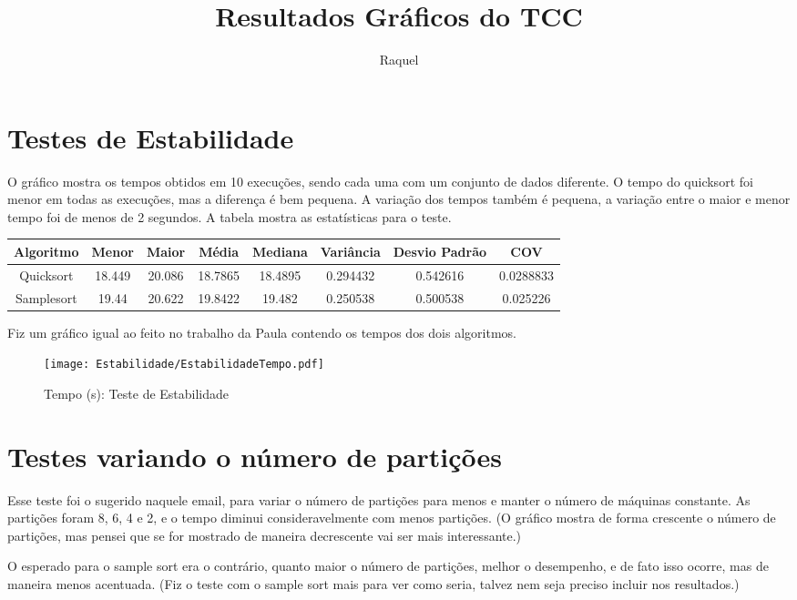 \documentclass[12pt,a4paper]{article}
\author{Raquel}
\title{Resultados Gráficos do TCC}
\begin{document}
\section{Testes de Estabilidade}

O gráfico mostra os tempos obtidos em 10 execuções, sendo cada uma com um conjunto de dados diferente. 
O tempo do quicksort foi menor em todas as execuções, mas a diferença é bem pequena. 
A variação dos tempos também é pequena, a variação entre o maior e menor tempo foi de menos de 2 segundos. A tabela mostra as
estatísticas para o teste. 

\begin{table}[!htb]
\begin{tabular}{|c|c|c|c|c|c|c|c|} \hline
Algoritmo & Menor & Maior & Média & Mediana & Variância & Desvio Padrão & COV \\
\hline 
Quicksort & 18.449  & 20.086  & 18.7865  & 18.4895  & 0.294432  & 0.542616  & 0.0288833 \\ 
\hline 
Samplesort & 19.44  & 20.622 & 19.8422 & 19.482 & 0.250538 & 0.500538 &  0.025226 \\ 
\hline 
\end{tabular}%
\end{table}


Fiz um gráfico igual ao feito no trabalho da Paula contendo os tempos dos dois algoritmos. 
\begin{figure}[!htb]
\centering
\texttt{[image: Estabilidade/EstabilidadeTempo.pdf]} 
\caption{Tempo (s): Teste de Estabilidade}
\end{figure}

\newpage

\section{Testes variando o número de partições}


Esse teste foi o sugerido naquele email, para variar o número de partições
para menos e manter o número de máquinas constante. 
As partições foram 8, 6, 4 e 2, e o tempo diminui consideravelmente com menos partições. 
(O gráfico mostra de forma crescente o número de partições, mas pensei que se for mostrado de maneira decrescente vai ser mais interessante.)


O esperado para o sample sort era o contrário, quanto maior o número de partições, melhor o desempenho, e de fato isso ocorre, mas de maneira menos acentuada. (Fiz o teste com o sample sort mais para ver como seria, talvez nem seja preciso incluir nos resultados.)
\end{document}
